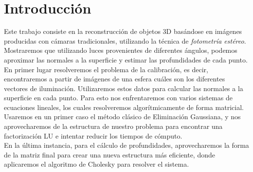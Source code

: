 \section{Introducción}


Este trabajo consiste en la reconstrucción de objetos 3D basándose en imágenes producidas con cámaras tradicionales, utilizando la técnica de \textit{fotometría estéreo}. Mostraremos que utilizando luces provenientes de diferentes ángulos, podemos aproximar las normales a la superficie y estimar las profundidades de cada punto. \\

En primer lugar resolveremos el problema de la calibración, es decir, encontraremos a partir de imágenes de una esfera cuáles son los diferentes vectores de iluminación. Utilizaremos estos datos para calcular las normales a la superficie en cada punto. Para esto nos enfrentaremos con varios sistemas de ecuaciones lineales, los cuales resolveremos algorítmicamente de forma matricial. Usaremos en un primer caso el método clásico de Eliminación Gaussiana, y nos aprovecharemos de la estructura de nuestro problema para encontrar una factorización LU e intentar reducir los tiempos de cómputo. \\

En la última instancia, para el cálculo de profundidades, aprovecharemos la forma de la matriz final para crear una nueva estructura más eficiente, donde aplicaremos el algoritmo de Cholesky para resolver el sistema. \\
